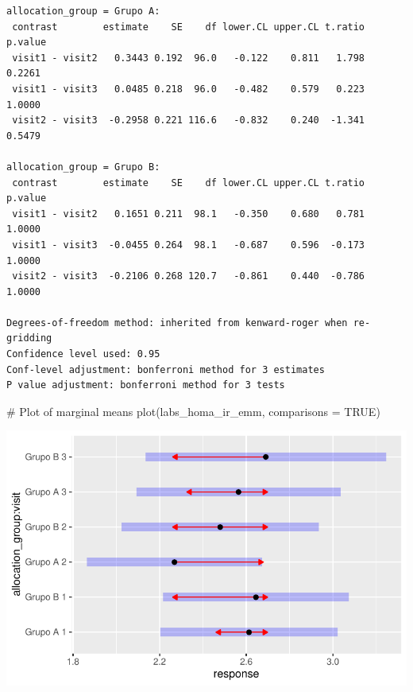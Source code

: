 \documentclass[
  letterpaper,
  DIV=11,
  numbers=noendperiod]{scrartcl}
\newenvironment{Shaded}{\begin{snugshade}}{\end{snugshade}}
\newcommand{\AttributeTok}[1]{\textcolor[rgb]{0.40,0.45,0.13}{#1}}
\newcommand{\CommentTok}[1]{\textcolor[rgb]{0.37,0.37,0.37}{#1}}
\newcommand{\ConstantTok}[1]{\textcolor[rgb]{0.56,0.35,0.01}{#1}}
\newcommand{\FunctionTok}[1]{\textcolor[rgb]{0.28,0.35,0.67}{#1}}
\newcommand{\NormalTok}[1]{\textcolor[rgb]{0.00,0.23,0.31}{#1}}
\begin{document}
\begin{verbatim}
allocation_group = Grupo A:
 contrast        estimate    SE    df lower.CL upper.CL t.ratio p.value
 visit1 - visit2   0.3443 0.192  96.0   -0.122    0.811   1.798  0.2261
 visit1 - visit3   0.0485 0.218  96.0   -0.482    0.579   0.223  1.0000
 visit2 - visit3  -0.2958 0.221 116.6   -0.832    0.240  -1.341  0.5479

allocation_group = Grupo B:
 contrast        estimate    SE    df lower.CL upper.CL t.ratio p.value
 visit1 - visit2   0.1651 0.211  98.1   -0.350    0.680   0.781  1.0000
 visit1 - visit3  -0.0455 0.264  98.1   -0.687    0.596  -0.173  1.0000
 visit2 - visit3  -0.2106 0.268 120.7   -0.861    0.440  -0.786  1.0000

Degrees-of-freedom method: inherited from kenward-roger when re-gridding 
Confidence level used: 0.95 
Conf-level adjustment: bonferroni method for 3 estimates 
P value adjustment: bonferroni method for 3 tests 
\end{verbatim}

\begin{Shaded}
\begin{Highlighting}[]
\CommentTok{\# Plot of marginal means}
\FunctionTok{plot}\NormalTok{(labs\_homa\_ir\_emm, }\AttributeTok{comparisons =} \ConstantTok{TRUE}\NormalTok{)}
\end{Highlighting}
\end{Shaded}

\includegraphics{Outcomes_V1V2V3_files/figure-pdf/labs_homa_ir_sens_emm-1.pdf}
\end{document}
